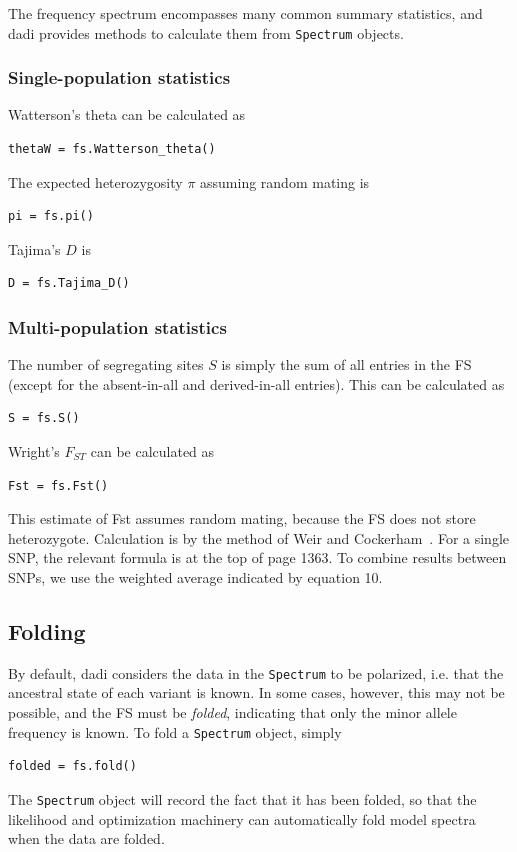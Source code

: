 \documentclass[12pt]{article}
\makeatletter
\newcommand{\dadi}{dadi\xspace}
\newcommand{\py}[1]{\lstinline[language=Python, showstringspaces=False]@#1@}
\makeatother
\begin{document}
The frequency spectrum encompasses many common summary statistics, and \dadi provides methods to calculate them from \py{Spectrum} objects.

\subsubsection{Single-population statistics}

Watterson's theta can be calculated as
\begin{lstlisting}
thetaW = fs.Watterson_theta()
\end{lstlisting}

The expected heterozygosity $\pi$ assuming random mating is
\begin{lstlisting}
pi = fs.pi()
\end{lstlisting}

Tajima's $D$ is
\begin{lstlisting}
D = fs.Tajima_D()
\end{lstlisting}

\subsubsection{Multi-population statistics}

The number of segregating sites $S$ is simply the sum of all entries in the FS (except for the absent-in-all and derived-in-all entries).
This can be calculated as
\begin{lstlisting}
S = fs.S()
\end{lstlisting}

Wright's $F_{ST}$ can be calculated as
\begin{lstlisting}
Fst = fs.Fst()
\end{lstlisting}
This estimate of Fst assumes random mating, because the FS does not store heterozygote.
Calculation is by the method of Weir and Cockerham~\cite{bib:Weir1984}.
For a single SNP, the relevant formula is at the top of page 1363.
To combine results between SNPs, we use the weighted average indicated by equation 10.

\subsection{Folding}

By default, \dadi considers the data in the \py{Spectrum} to be polarized, i.e. that the ancestral state of each variant is known.
In some cases, however, this may not be possible, and the FS must be \emph{folded}, indicating that only the minor allele frequency is known.
To fold a \py{Spectrum} object, simply
\begin{lstlisting}
folded = fs.fold()
\end{lstlisting}
The \py{Spectrum} object will record the fact that it has been folded, so that the likelihood and optimization machinery can automatically fold model spectra when the data are folded.
\end{document}
